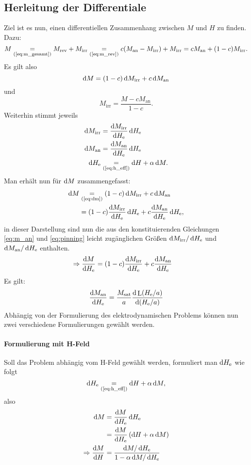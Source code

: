 \documentclass{scrartcl}
\DeclareMathOperator{\Langevin}{L}
\newcommand{\He}{H_\text{e}}
\newcommand{\Man}{M_\text{an}}
\newcommand{\Msat}{M_\text{sat}}
\newcommand{\Mirr}{M_\text{irr}}
\newcommand{\Mrev}{M_\text{rev}}
\newcommand{\textref}[1]{\text{(\ref{#1})}}
\newcommand{\eqr}[1]{\underset{\textref{#1}}{=}}
\begin{document}
\subsection{Herleitung der Differentiale}
Ziel ist es nun, einen differentiellen Zusammenhang zwischen $M$ und $H$ zu finden. Dazu:
\begin{equation}
	M \underset{\textref{eq:m_gesamt}}{=} \Mrev + \Mirr \underset{\textref{eq:m_rev}}{=} c (\Man - \Mirr) + \Mirr = c\Man + (1-c)\Mirr.
\end{equation}
Es gilt also
\begin{equation}
	\dif M = (1-c) \dif\Mirr + c\dif \Man \label{eq:dm}
\end{equation}
und 
\begin{equation}
	\Mirr = \frac{M - c\Man}{1 - c}.
\end{equation}
Weiterhin stimmt jeweils
\begin{align}
	\dif \Mirr &= \frac{\dif \Mirr}{\dif \He}\dif \He \\
	\dif \Man &= \frac{\dif \Man}{\dif \He}\dif \He\\
	\dif \He & \underset{\textref{eq:h_eff}}{=} \dif H + \alpha \dif M.
\end{align}
Man erhält nun für $\mathop{}\!\mathrm{d} M$ zusammengefasst:
\begin{align}
	\begin{split}
		\dif M &\eqr{eq:dm} (1-c) \dif\Mirr + c\dif \Man \\
				&= (1-c) \frac{\dif \Mirr}{\dif \He}\dif \He + c \frac{\dif \Man}{\dif \He}\dif \He,
	\end{split}
\end{align}
in dieser Darstellung sind nun die aus den konstituierenden Gleichungen \ref{eq:m_an} und \ref{eq:pinning} leicht zugänglichen Größen $\dif \Mirr/\dif \He$ und $\dif \Man/\dif \He$ enthalten.
\begin{align}
	\Rightarrow \frac{\dif M}{\dif \He} &= (1-c) \frac{\dif \Mirr}{\dif \He} + c \frac{\dif \Man}{\dif \He} \label{eq:dm_dhe}
\end{align}
Es gilt:
\begin{equation}
	\frac{\dif \Man}{\dif \He} = \frac{\Msat}{a} \frac{\dif \Langevin(\He/a)}{\dif(\He/a)}
\end{equation}
Abhängig von der Formulierung des elektrodynamischen Problems können nun zwei verschiedene Formulierungen gewählt werden.
\paragraph{Formulierung mit H-Feld}
Soll das Problem abhängig vom H-Feld gewählt werden, formuliert man $\dif \He$ wie folgt
\begin{equation}
	\dif \He \eqr{eq:h_eff} \dif H + \alpha \dif M,
\end{equation}
also
\begin{align}
	\dif M &= \frac{\dif M}{\dif \He} \dif \He \\
	&= \frac{\dif M}{\dif \He} \left(\dif H + \alpha \dif M\right) \\
	\Rightarrow \frac{\dif M}{\dif H} &= \frac{\dif M / \dif \He}{1 - \alpha \dif M /\dif \He}
\end{align}
\end{document}

